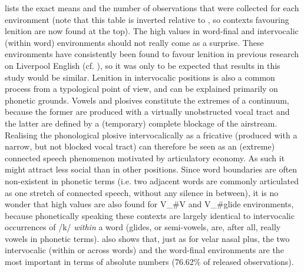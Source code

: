  lists the exact means and the number of observations that were collected for each environment (note that this table is inverted relative to , so contexts favouring lenition are now found at the top).
The high  values in word-final and intervocalic (within word) environments should not really come as a surprise.
These environments have consistently been found to favour lenition in previous research on Liverpool English (cf. ), so it was only to be expected that results in this study would be similar.
Lenition in intervocalic positions is also a common process from a typological point of view, and can be explained primarily on phonetic grounds. 
Vowels and plosives constitute the extremes of a continuum, because the former are produced with a virtually unobstructed vocal tract and the latter are defined by a (temporary) complete blockage of the airstream.
Realising the phonological plosive intervocalically as a fricative (produced with a narrow, but not blocked vocal tract) can therefore be seen as an (extreme) connected speech phenomenon motivated by articulatory economy.
As such it might attract less social  than in other positions.
Since word boundaries are often non-existent in phonetic terms (i.e. two adjacent words are commonly articulated as one stretch of connected speech, without any silence in between), it is no wonder that high  values are also found for V\_\#V and V\_\#glide environments, because phonetically speaking these contexts are largely identical to intervocalic occurrences of /k/ \emph{within} a word (glides, or semi-vowels, are, after all, really vowels in phonetic terms).
 also shows that, just as for velar nasal plus, the two intervocalic (within or across words) and the word-final environments are the most important in terms of absolute numbers (76.62\% of released observations).

